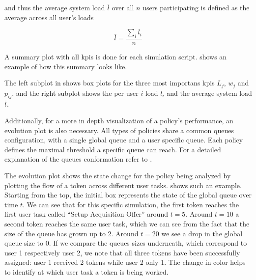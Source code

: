 and thus the average system load $\overline{l}$ over all $n$ users participating is defined as the average across all user's loads \ie

\begin{equation}
	\overline{l} = \frac{\sum_i l_i}{n}
\end{equation}

A summary plot with all \glspl{kpi} is done for each simulation script.  shows an example of how this summary looks like.


The left subplot in  shows box plots for the three most importans \glspl{kpi} \ie $L_j$, $w_j$ and $p_{ij}$, and the right subplot shows the per user $i$ load $l_i$ and the average system load $\overline{l}$.

Additionally, for a more in depth visualization of a policy's performance, an evolution plot is also necessary. All types of policies share a common queues configuration, with a single global queue and a user specific queue. Each policy defines the maximal threshold a specific queue can reach. For a detailed explanation of the queues conformation refer to .

The evolution plot shows the state change for the policy being analyzed by plotting the flow of a token across different user tasks.  shows such an example. Starting from the top, the initial box represents the state of the global queue over time $t$. We can see that for this specific simulation, the first token reaches the first user task called ``Setup Acquisition Offer'' around $t=5$. Around $t=10$ a second token reaches the same user task, which we can see from the fact that the size of the queue has grown up to $2$. Around $t=20$ we see a drop in the global queue size to $0$. If we compare the queues sizes underneath, which correspond to user 1 respectively user 2, we note that all three tokens have been successfully assigned: user 1 received 2 tokens while user 2 only 1. The change in color helps to identify at which user task a token is being worked.

